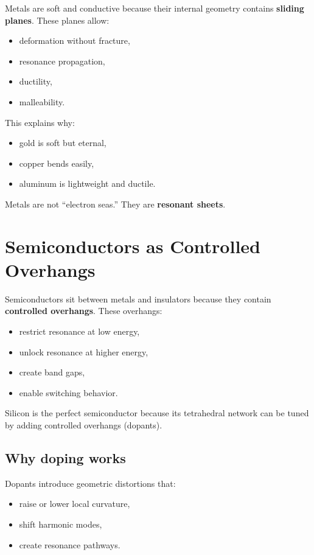 \documentclass[11pt, letterpaper, openany]{book}
\begin{document}
Metals are soft and conductive because their internal geometry contains \textbf{sliding
planes}. These planes allow:

\begin{itemize}
    \item deformation without fracture,
    \item resonance propagation,
    \item ductility,
    \item malleability.
\end{itemize}

This explains why:

\begin{itemize}
    \item gold is soft but eternal,
    \item copper bends easily,
    \item aluminum is lightweight and ductile.
\end{itemize}

Metals are not “electron seas.”  
They are \textbf{resonant sheets}.

\section{Semiconductors as Controlled Overhangs}

Semiconductors sit between metals and insulators because they contain \textbf{controlled
overhangs}. These overhangs:

\begin{itemize}
    \item restrict resonance at low energy,
    \item unlock resonance at higher energy,
    \item create band gaps,
    \item enable switching behavior.
\end{itemize}

Silicon is the perfect semiconductor because its tetrahedral network can be tuned by
adding controlled overhangs (dopants).

\subsection*{Why doping works}

Dopants introduce geometric distortions that:

\begin{itemize}
    \item raise or lower local curvature,
    \item shift harmonic modes,
    \item create resonance pathways.
\end{itemize}
\end{document}
